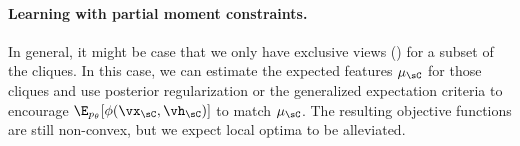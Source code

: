 \paragraph{Learning with partial moment constraints.}

In general, it might be case that we only have exclusive views () for a subset of the cliques.
In this case, we can estimate the expected features $\mu_\sC$ for those cliques
  and use posterior regularization \citep{graca08em} or the generalized expectation criteria \citep{mann08ge}
  to encourage $\E_{p_\theta}[\phi(\vx_\sC,\vh_\sC)]$ to match $\mu_\sC$.
The resulting objective functions are still non-convex, but we expect
  local optima to be alleviated. 




